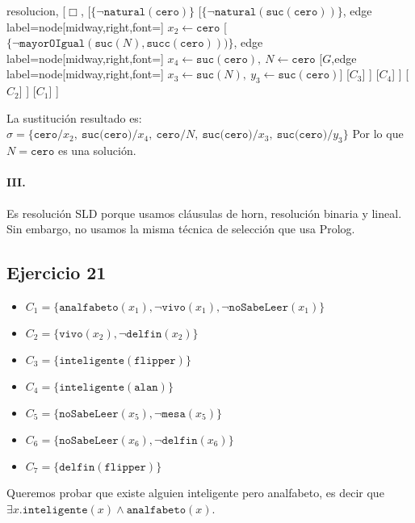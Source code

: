 \documentclass[10pt,a4paper]{article}
\begin{document}
\begin{center}
	\begin{forest} resolucion,
[$\Box$,
    [$\{ \lnot \texttt{natural}(\texttt{cero})\}$
        [$\{\lnot \texttt{natural}(\texttt{suc}(\texttt{cero}))\}$, edge label={node[midway,right,font=\footnotesize] {$x_2\leftarrow \texttt{cero}$}}
            [$\{ \lnot \texttt{mayorOIgual}(\texttt{suc}(N)\comma \texttt{succ}(\texttt{cero})) )\}$, edge label={node[midway,right,font=\footnotesize] {$x_4\leftarrow \texttt{suc}(\texttt{cero}),~N\leftarrow \texttt{cero}$}}
                [$G$,edge label={node[midway,right,font=\footnotesize] {$x_3\leftarrow \texttt{suc}(N),~y_3\leftarrow \texttt{suc}(\texttt{cero})$}}]
                [$C_3$]
            ]
            [$C_4$]
        ]
        [$C_2$]
    ]
    [$C_1$]
]
	\end{forest}
\end{center}

 La sustitución resultado es: $\sigma = \{\texttt{cero}/x_2,~\texttt{suc(cero)}/x_4,~\texttt{cero}/N,~\texttt{suc(cero)}/x_3,~ \texttt{suc(cero)}/y_3\}$ Por lo que $N = \texttt{cero}$ es una solución.
\paragraph{III.} Es resolución SLD porque usamos cláusulas de horn, resolución binaria y lineal. Sin embargo, no usamos la misma técnica de selección que usa Prolog.

\subsection{Ejercicio 21}
\begin{itemize}
\item $C_1 = \{\texttt{analfabeto}(x_1), \lnot \texttt{vivo}(x_1), \lnot \texttt{noSabeLeer}(x_1) \}$
\item $C_2 = \{\texttt{vivo}(x_2), \lnot \texttt{delfin}(x_2) \}$
\item $C_3 = \{\texttt{inteligente}(\texttt{flipper})\}$
\item $C_4 = \{\texttt{inteligente}(\texttt{alan})\}$
\item $C_5 = \{\texttt{noSabeLeer}(x_5), \lnot \texttt{mesa}(x_5)\}$
\item $C_6 = \{\texttt{noSabeLeer}(x_6), \lnot \texttt{delfin}(x_6)\}$
\item $C_7 = \{\texttt{delfin}(\texttt{flipper})\}$
\end{itemize}
Queremos probar que existe alguien inteligente pero analfabeto, es decir que $\exists x.\texttt{inteligente}(x)\land\texttt{analfabeto}(x)$.
\end{document}
